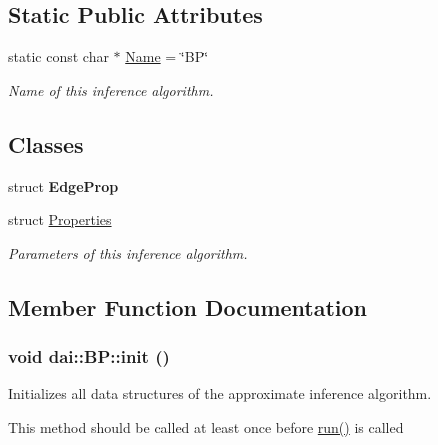 \subsection*{Static Public Attributes}
\begin{CompactItemize}
\item 
\hypertarget{classdai_1_1BP_f40ab22b371e927fd728569fdbcc607a}{
static const char $\ast$ \hyperlink{classdai_1_1BP_f40ab22b371e927fd728569fdbcc607a}{Name} = \char`\"{}BP\char`\"{}}
\label{classdai_1_1BP_f40ab22b371e927fd728569fdbcc607a}

\begin{CompactList}\small\item\em Name of this inference algorithm. \item\end{CompactList}\end{CompactItemize}
\subsection*{Classes}
\begin{CompactItemize}
\item 
struct \textbf{EdgeProp}
\item 
struct \hyperlink{structdai_1_1BP_1_1Properties}{Properties}
\begin{CompactList}\small\item\em Parameters of this inference algorithm. \item\end{CompactList}\end{CompactItemize}


\subsection{Member Function Documentation}
\hypertarget{classdai_1_1BP_83349319b22a2d71b1f4ef39709365f9}{
\subsubsection[init]{\setlength{\rightskip}{0pt plus 5cm}void dai::BP::init ()}}
\label{classdai_1_1BP_83349319b22a2d71b1f4ef39709365f9}


Initializes all data structures of the approximate inference algorithm. 

This method should be called at least once before \hyperlink{classdai_1_1BP_65e6e4e56d227a17d086c5fc8931d3ff}{run()} is called 

